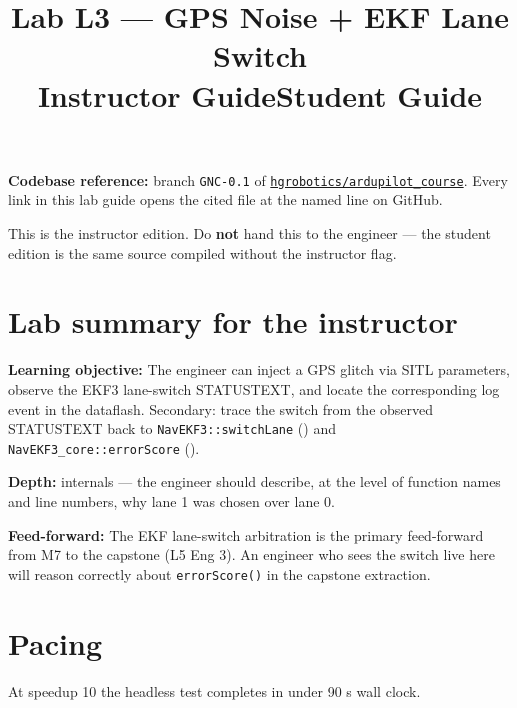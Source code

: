 \documentclass[a4paper,11pt,twoside]{article}
\title{Lab L3 --- GPS Noise + EKF Lane Switch\\
  \large \ifinstructor Instructor Guide\else Student Guide\fi}
\author{\copyrightline}
\date{}
\begin{document}
\maketitle

\noindent\textbf{Codebase reference:} branch \texttt{GNC-0.1} of \href{\repourl}{\nolinkurl{hgrobotics/ardupilot_course}}. Every link in this lab guide opens the cited file at the named line on GitHub.

\bigskip

\ifinstructor

\begin{tcolorbox}[colback=red!5!white,colframe=red!40!black,title=Instructor edition]
This is the instructor edition. Do \textbf{not} hand this to the engineer --- the student edition is the same source compiled without the instructor flag.
\end{tcolorbox}

\section*{Lab summary for the instructor}

\textbf{Learning objective:} The engineer can inject a GPS glitch via SITL parameters, observe the EKF3 lane-switch STATUSTEXT, and locate the corresponding log event in the dataflash. Secondary: trace the switch from the observed STATUSTEXT back to \texttt{NavEKF3::switchLane} () and \texttt{NavEKF3\_core::errorScore} ().

\textbf{Depth:} internals --- the engineer should describe, at the level of function names and line numbers, why lane 1 was chosen over lane 0.

\textbf{Feed-forward:} The EKF lane-switch arbitration is the primary feed-forward from M7 to the capstone (L5 Eng 3). An engineer who sees the switch live here will reason correctly about \texttt{errorScore()} in the capstone extraction.

\section*{Pacing}

At speedup 10 the headless test completes in under 90 s wall clock.
\end{document}
